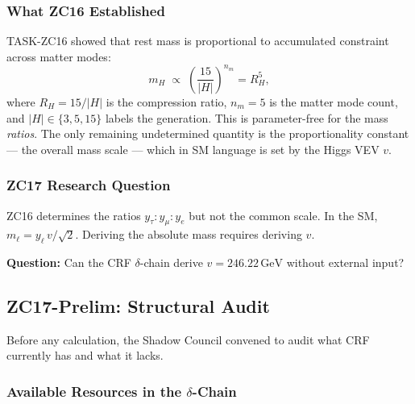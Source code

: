 \documentclass[12pt, a4paper]{article}
\begin{document}
\subsubsection{What ZC16 Established}

TASK-ZC16 showed that rest mass is proportional to accumulated
constraint across matter modes:
\begin{equation}
  m_H \;\propto\; \left(\frac{15}{|H|}\right)^{n_m}
  = R_H^5,
  \tag{EQ-MC-03}\label{zc17:eq:ZC16-mass}
\end{equation}
where $R_H = 15/|H|$ is the compression ratio,
$n_m = 5$ is the matter mode count, and $|H| \in \{3,5,15\}$
labels the generation. This is parameter-free for the
mass \emph{ratios}. The only remaining undetermined quantity
is the proportionality constant --- the overall mass scale
--- which in SM language is set by the Higgs VEV $v$.

\subsubsection{ZC17 Research Question}

\begin{formalbox}[title={GAP-ZC17-01: Absolute Yukawa Scale}]
ZC16 determines the ratios $y_\tau:y_\mu:y_e$ but not the
common scale. In the SM, $m_\ell = y_\ell\,v/\sqrt{2}$.
Deriving the absolute mass requires deriving $v$.

\medskip
\textbf{Question:} Can the CRF $\delta$-chain derive
$v = 246.22\,\mathrm{GeV}$ without external input?
\end{formalbox}

\subsection{ZC17-Prelim: Structural Audit}
\label{zc17:sec:prelim}

Before any calculation, the Shadow Council convened to
audit what CRF currently has and what it lacks.

\subsubsection{Available Resources in the \boldmath$\delta$-Chain}
\end{document}
